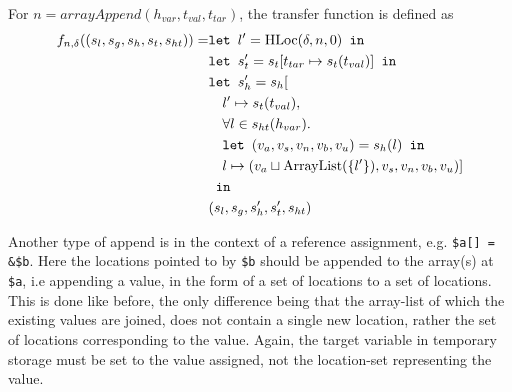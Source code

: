 For $n = \mathit{arrayAppend}(h_{var}, t_{val},t_{tar})$, the transfer function is defined as
\begin{align}
    f_{n,\delta}((s_l, s_g, s_h, s_t, s_{ht})) = &\texttt{let } l' = \text{HLoc}(\delta, n, 0) \texttt{ in } \notag\\
                              &\texttt{let } s_t' = s_t[t_{tar}\mapsto s_t(t_{val})] \texttt{ in }\notag\\
                              &\texttt{let } s_h' = s_h[\notag\\
                              &\quad l' \mapsto s_t(t_{val}), \notag\\
                              &\quad \forall l \in s_{ht}(h_{var}).\notag\\
                              &\quad\texttt{let } (v_a,v_s,v_n,v_b,v_u) = s_h(l) \texttt{ in } \notag\\
                              &\quad l\mapsto (v_a \sqcup \text{ArrayList}(\{l'\}), v_s, v_n, v_b, v_u)]\notag\\
                              & \texttt{ in }\notag\\
                              &(s_l, s_g, s_h', s_t', s_{ht})
\end{align}

Another type of append is in the context of a reference assignment, e.g. \texttt{\$a[] = \&\$b}. Here the locations pointed to by \texttt{\$b} should be appended to the array(s) at \texttt{\$a}, i.e appending a value, in the form of a set of locations to a set of locations. This is done like before, the only difference being that the array-list of which the existing values are joined, does not contain a single new location, rather the set of locations corresponding to the value. Again, the target variable in temporary storage must be set to the value assigned, not the location-set representing the value.

